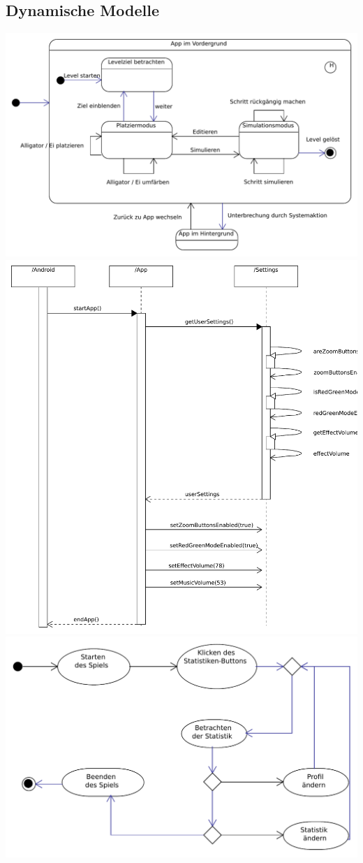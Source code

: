 \subsection{Dynamische Modelle}
\clearpage
\includegraphics[scale=0.6]{Systemmodelle/game_state.pdf}
\clearpage
\includegraphics[scale=0.6]{Systemmodelle/edit_settings_sequence.pdf}
\clearpage
\includegraphics[scale=0.6]{Systemmodelle/parent_activity.pdf}

